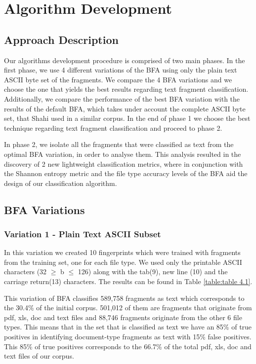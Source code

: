 \chapter{Algorithm Development}\label{chap:4}

\section{Approach Description}
Our algorithms development procedure is comprised of two main phases. In the first phase, we use 4 different variations of the BFA using only the plain text ASCII byte set of the fragments. We compare the 4 BFA variations and we choose the one that yields the best results regarding text fragment classification. Additionally, we compare the performance of the best BFA variation with the results of the default BFA, which takes under account the complete ASCII byte set, that Shahi\cite{Ashim} used in a similar corpus. In the end of phase 1 we choose the best technique regarding text fragment classification and proceed to phase 2.

In phase 2, we isolate all the fragments that were classified as text from the optimal BFA variation, in order to analyse them. This analysis resulted in the discovery of 2 new lightweight classification metrics, where in conjunction with the Shannon entropy\cite{Shannon} metric and the file type accuracy levels of the BFA aid the design of our classification algorithm.
\newpage

\section{BFA Variations}

\subsection{Variation 1 - Plain Text ASCII Subset}

In this variation we created 10 fingerprints which were trained with fragments from the training set, one for each file type. We used only the printable ASCII characters (32 $\geq$  b $\leq$ 126) along with the tab(9), new line (10) and the carriage return(13) characters. The results can be found in Table \ref{table:table 4.1}.

 This variation of BFA classifies 589,758 fragments as text which corresponds to the 30.4\% of the initial corpus. 501,012 of them are fragments that originate from pdf, xls, doc and text files and 88,746 fragments originate from the other 6 file types. This means that in the set that is classified as text we have an 85\% of true positives in identifying document-type fragments as text with 15\% false positives. This 85\% of true positives corresponds to the 66.7\% of the total pdf, xls, doc and text files of our corpus.\\

